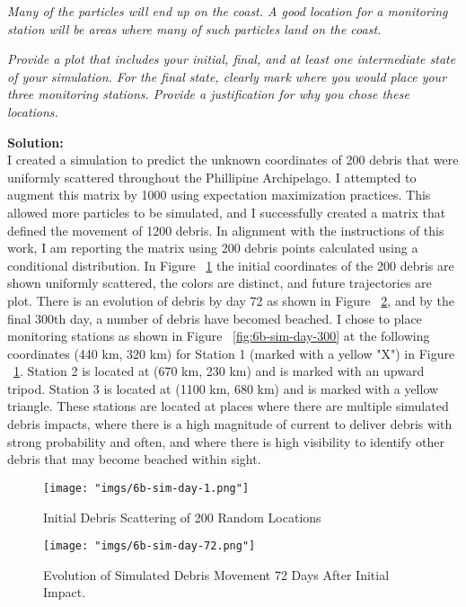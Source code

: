 \documentclass[11pt]{article}
\newcommand{\question}[1]{\textit{#1}}
\begin{document}
\question{Many of the particles will end up on the coast. A good location for a monitoring station will be areas where many of such particles land on the coast.}

\question{Provide a plot that includes your initial, final, and at least one intermediate state of your simulation. For the final state, clearly mark where you would place your three monitoring stations. Provide a justification for why you chose these locations. }

\textbf{Solution:} \\
I created a simulation to predict the unknown coordinates of 200 debris that were uniformly scattered throughout the Phillipine Archipelago. I attempted to augment this matrix by 1000 using expectation maximization practices. 
This allowed more particles to be simulated, and I successfully created a matrix that defined the movement of 1200 debris. In alignment with the instructions of this work, I am reporting the matrix using 200 debris points calculated using a conditional distribution. In Figure ~\ref{fig:6b-sim-day-1} the initial coordinates of the 200 debris are shown uniformly scattered, the colors are distinct, and future trajectories are plot. There is an evolution of debris by day 72 as shown in Figure ~\ref{fig:6b-sim-day-72}, and by the final 300th day, a number of debris have becomed beached. I chose to place monitoring stations as shown in Figure ~\ref{fig:6b-sim-day-300} at the following coordinates (440 km, 320 km) for Station 1 (marked with a yellow "X") in Figure ~\ref{fig:6b-sim-day-1}. Station 2 is located at (670 km, 230 km) and is marked with an upward tripod. Station 3 is located at (1100 km, 680 km) and is marked with a yellow triangle. These stations are located at places where there are multiple simulated debris impacts, where there is a high magnitude of current to deliver debris with strong probability and often, and where there is high visibility to identify other debris that may become beached within sight.


\begin{figure}[htbp]
    \centering
    \texttt{[image: "imgs/6b-sim-day-1.png"]} %
    \caption{Initial Debris Scattering of 200 Random Locations}
    \label{fig:6b-sim-day-1}
\end{figure}
\FloatBarrier

\begin{figure}[htbp]
    \centering
    \texttt{[image: "imgs/6b-sim-day-72.png"]} %
    \caption{Evolution of Simulated Debris Movement 72 Days After Initial Impact.}
    \label{fig:6b-sim-day-72}
\end{figure}
\FloatBarrier
\end{document}
